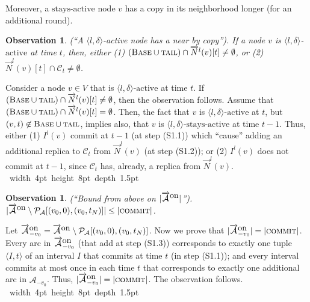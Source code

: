 \documentclass[11pt]{article}
\newtheorem{observation}[theorem]{Observation}
\def\proof{\par\noindent{\bf Proof:~}}
\def\blackslug{\hbox{\hskip 1pt \vrule width 4pt height 8pt
    depth 1.5pt \hskip 1pt}}
\def\QED{\quad\blackslug\lower 8.5pt\null\par}
\newcommand{\rot}[0]{v_0}
\newcommand{\neigh}[0]{N}
\newcommand{\stayactive}[0]{\mbox{stays-active}}
\newcommand{\Active}[0]{\mbox{active}}
\newcommand{\calA}{\mathcal{A}}
\newcommand{\calP}{\mathcal{P}}
\newcommand{\calC}{\mathcal{C}}
\newcommand{\DBase}[0]{{\mbox{\sc Base}}}
\newcommand{\rep}[2]{(#1,#2)}
\newcommand{\NN}{N}
\newcommand{\NID}[2]{\overrightarrow{\neigh}^{#1}(#2)}
\newcommand{\tail}[0]{\mbox{\sc tail}}
\newcommand{\ADon}[0]{\overrightarrow{\calA}^{\mbox{\upshape on}}}
\newcommand{\DCOMMIT}[0]{\mbox{\sc commit}}
\begin{document}
Moreover, a $\stayactive$ node $v$ has a copy in its neighborhood longer (for an additional round).



\begin{observation}
{\sc (``A $\langle l,\delta\rangle$-active node has a near by copy'').}
If a node $v$ is $\langle l,\delta\rangle$-$\Active$ at time $t$, then, either
(1) $(\DBase\cup\tail)\cap\NID{l}{v}[t]\not=\emptyset$,
or
(2) $\NID{l}{v}[t]\cap \calC_{t}\not=\emptyset$.
\label{obser:Dlineon: a l active has a near by copy}
\end{observation}
\def\AppObserDlineonActiveNearByCopy{
\proof
Consider a node $v\in V$ that is $\langle l,\delta\rangle$-$\Active$  at time $t$.
If $(\DBase\cup\tail)\cap\NID{l}{v}[t]\not=\emptyset$, then the observation follows.
Assume that $(\DBase\cup\tail)\cap\NID{l}{v}[t]=\emptyset$.
Then, the fact that $v$ is $\langle l,\delta\rangle$-$\Active$ at $t$,
but $(v,t)\not\in\DBase\cup\tail$, implies also, that $v$ is $\langle l,\delta\rangle$-$\stayactive$ at time $t-1$.
Thus,  either (1) $I^l(v)$ commit at $t-1$ (at step (S1.1)) which ``cause'' adding an additional replica to $\calC_t$ from $\NID{l}{v}$ (at step (S1.2));
or (2) $I^l(v)$ does not commit at $t-1$, since $\calC_t$ has, already, a replica from $\NID{l}{v}$.
\QED
} \AppObserDlineonActiveNearByCopy



\begin{observation}
{\sc (``Bound from above on $|\ADon|$'').}
$|\ADon\setminus \calP_\calA[\rep{\rot}{0},\rep{\rot}{t_{\NN}}]|\leq |\DCOMMIT|$.
\label{obser:Dlineon: |Commit|=|Aon-0|}
\end{observation}
\def\AppObserDlineonBoundFromAboveonCommit{
\proof
Let
$\ADon_{-\rot}=\ADon\setminus\calP_\calA[\rep{\rot}{0},\rep{\rot}{t_{\NN}}]$.
Now we prove that $|\ADon_{-\rot}|=|\DCOMMIT|$.
Every arc in $\ADon_{-\rot}$ (that add at step (S1.3)) corresponds to exactly one tuple $\langle I,t\rangle$ of an interval $I$ that commits at time $t$ (in step (S1.1));
and every interval commits at most once in each time $t$ that corresponds to exactly one additional arc in $\calA_{-\rot}$.
Thus, $|\ADon_{-\rot}|=|\DCOMMIT|$.
The observation follows.
\QED
} \AppObserDlineonBoundFromAboveonCommit


\vspace{-0.5cm}
\end{document}
